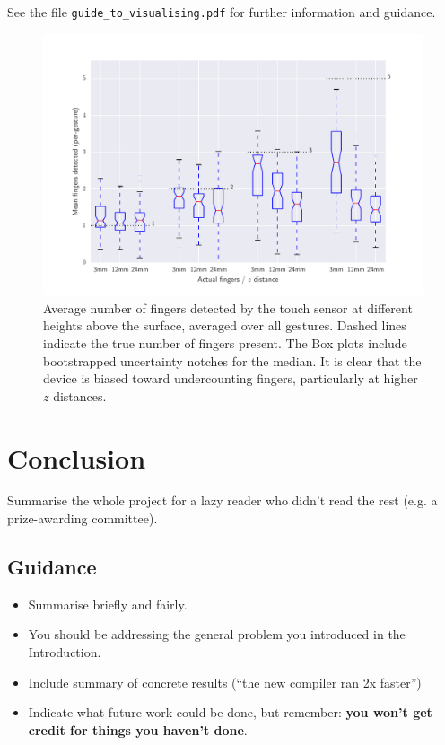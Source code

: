 \documentclass{l4proj}
\begin{document}
See the file \texttt{guide\_to\_visualising.pdf} for further information and guidance.

\begin{figure}
    \centering
    \includegraphics[width=1.0\linewidth]{images/boxplot_finger_distance.pdf}    

    \caption{Average number of fingers detected by the touch sensor at different heights above the surface, averaged over all gestures. Dashed lines indicate
    the true number of fingers present. The Box plots include bootstrapped uncertainty notches for the median. It is clear that the device is biased toward 
    undercounting fingers, particularly at higher $z$ distances.
    }

    \label{fig:boxplot} 
\end{figure}


\chapter{Conclusion}    
Summarise the whole project for a lazy reader who didn't read the rest (e.g. a prize-awarding committee).
\section{Guidance}
\begin{itemize}
    \item
        Summarise briefly and fairly.
    \item
        You should be addressing the general problem you introduced in the
        Introduction.        
    \item
        Include summary of concrete results (``the new compiler ran 2x
        faster'')
    \item
        Indicate what future work could be done, but remember: \textbf{you
        won't get credit for things you haven't done}.
\end{itemize}
\end{document}

